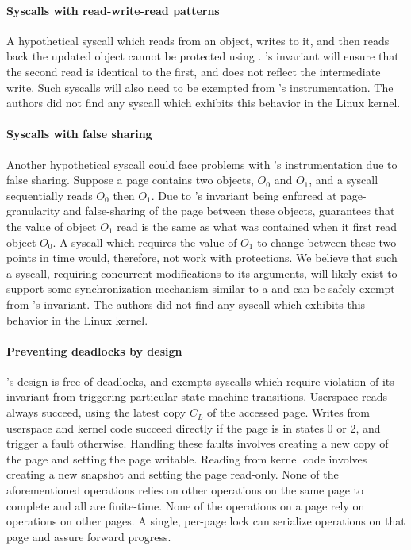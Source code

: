 \documentclass[letterpaper,twocolumn,10pt, anonymous]{article}
\begin{document}
\paragraph{Syscalls with read-write-read patterns}
A hypothetical syscall which reads from an object, writes to it, and
then reads back the updated object cannot be protected using \tiktok.
\tiktok's invariant will ensure that the second read is identical to the first,
and does not reflect the intermediate write. 
Such syscalls will also need to be exempted from \tiktok's instrumentation.
The authors did not find any syscall which exhibits this behavior in the Linux
kernel. 

\paragraph{Syscalls with false sharing}
Another hypothetical syscall could face problems with \tiktok's 
instrumentation due to false sharing. 
Suppose a page contains two objects, $O_0$ and $O_1$, and a syscall  
sequentially reads $O_0$ then $O_1$.
Due to \tiktok's invariant being enforced at page-granularity and 
false-sharing of the page between these objects, \tiktok guarantees that
the value of object $O_1$ read is the same as what was contained when it 
first read object $O_0$. 
A syscall which requires the value of $O_1$ to change between these two 
points in time would, therefore, not work with \tiktok protections. 
We believe that such a syscall, requiring concurrent modifications to its 
arguments, will likely exist to support some synchronization mechanism 
similar to a  and can be safely exempt from \tiktok's invariant.
The authors did not find any syscall which exhibits this behavior in the 
Linux kernel. 


\paragraph{Preventing deadlocks by design}
\tiktok's design is free of deadlocks, and exempts syscalls which 
require violation of its invariant from triggering particular 
state-machine transitions.
Userspace reads always succeed, using the latest copy $C_L$ of the
accessed page.
Writes from userspace and kernel code succeed directly if the 
page is in states 0 or 2, and trigger a fault otherwise.
Handling these faults involves creating a new copy of the page and
setting the page writable. 
Reading from kernel code involves creating a new snapshot and 
setting the page read-only.
None of the aforementioned operations relies on other operations 
on the same page to complete and all are finite-time.
None of the operations on a page rely on operations on other pages.
A single, per-page lock can serialize operations on that page
and assure forward progress.
\end{document}
